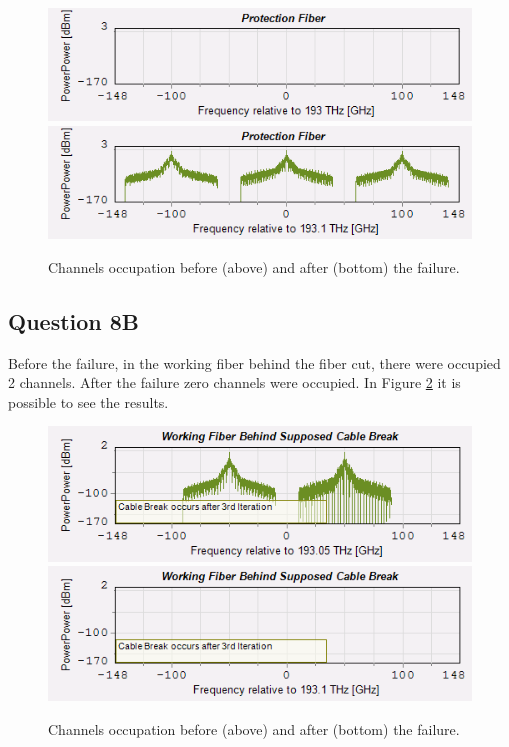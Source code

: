 \documentclass[a4paper,10pt]{report}
\begin{document}
\begin{figure}[!ht]
   \centering
   \includegraphics[width=12cm]{q8a1.png}\\
   \includegraphics[width=12cm]{q8a2.png}\\
   \caption{Channels occupation before (above) and after (bottom) the failure.}
   \label{q8a}
\end{figure}

\subsection*{Question 8B}
Before the failure, in the working fiber behind the fiber cut, there were occupied 2 channels.
After the failure zero channels were occupied.
In Figure \ref{q8b} it is possible to see the results.

\begin{figure}[!ht]
   \centering
   \includegraphics[width=12cm]{q8b1.png}\\
   \includegraphics[width=12cm]{q8b2.png}\\
   \caption{Channels occupation before (above) and after (bottom) the failure.}
   \label{q8b}
\end{figure}
\end{document}
